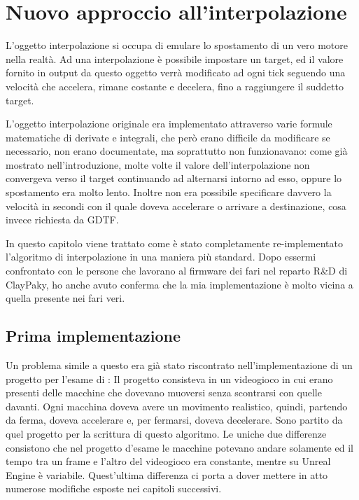 \documentclass[main.tex]{subfiles}
\begin{document}
\sloppy

\vspace{1.0cm}

\section{Nuovo approccio all'interpolazione}\label{sec:Interpolation}
\lstset{language=UEcpp}
L'oggetto interpolazione si occupa di emulare lo spostamento di un vero motore nella realtà. Ad una interpolazione è possibile impostare un target, ed il valore fornito in output da questo oggetto verrà modificato ad ogni tick seguendo una velocità che accelera, rimane costante e decelera, fino a raggiungere il suddetto target.

L'oggetto interpolazione originale era implementato attraverso varie formule matematiche di derivate e integrali, che però erano difficile da modificare se necessario, non erano documentate, ma soprattutto non funzionavano: come già mostrato nell'introduzione, molte volte il valore dell'interpolazione non convergeva verso il target continuando ad alternarsi intorno ad esso, oppure lo spostamento era molto lento. Inoltre non era possibile specificare davvero la velocità in secondi con il quale doveva accelerare o arrivare a destinazione, cosa invece richiesta da GDTF.\newline

In questo capitolo viene trattato come è stato completamente re-implementato l'algoritmo di interpolazione in una maniera più standard. Dopo essermi confrontato con le persone che lavorano al firmware dei fari nel reparto R\&D di ClayPaky, ho anche avuto conferma che la mia implementazione è molto vicina a quella presente nei fari veri.

\subsection{Prima implementazione}\label{subsec:4_trafficImplementation}
Un problema simile a questo era già stato riscontrato nell'implementazione di un progetto per l'esame di  \cite{TrafficGame}: Il progetto consisteva in un videogioco in cui erano presenti delle macchine che dovevano muoversi senza scontrarsi con quelle davanti. Ogni macchina doveva avere un movimento realistico, quindi, partendo da ferma, doveva accelerare e, per fermarsi, doveva decelerare. Sono partito da quel progetto per la scrittura di questo algoritmo. Le uniche due differenze consistono che nel progetto d'esame le macchine potevano andare solamente  ed il tempo tra un frame e l'altro del videogioco era constante, mentre su Unreal Engine è variabile. Quest'ultima differenza ci porta a dover mettere in atto numerose modifiche esposte nei capitoli successivi.\newline
\end{document}
